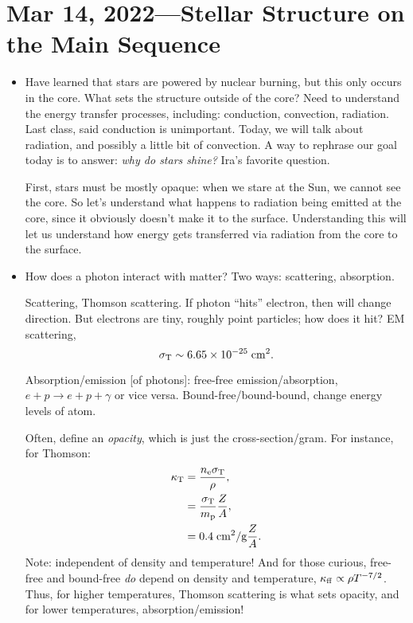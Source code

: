 \documentclass[11pt,
        usenames, %
        dvipsnames %
    ]{article}
\newcommand*{\scinot}[2]{#1\times10^{#2}}
\begin{document}
\section{Mar 14, 2022---Stellar Structure on the Main Sequence}

\begin{itemize}
    \item Have learned that stars are powered by nuclear burning, but this only
        occurs in the core. What sets the structure outside of the core? Need to
        understand the energy transfer processes, including: conduction,
        convection, radiation. Last class, said conduction is unimportant.
        Today, we will talk about radiation, and possibly a little bit of
        convection. A way to rephrase our goal today is to answer: \emph{why do
        stars shine?} Ira's favorite question.

        First, stars must be mostly opaque: when we stare at the Sun, we cannot
        see the core. So let's understand what happens to radiation being
        emitted at the core, since it obviously doesn't make it to the surface.
        Understanding this will let us understand how energy gets transferred
        via radiation from the core to the surface.

    \item How does a photon interact with matter? Two ways: scattering,
        absorption.

        Scattering, Thomson scattering. If photon ``hits'' electron, then will
        change direction. But electrons are tiny, roughly point particles; how
        does it hit? EM scattering,
        \begin{equation}
            \sigma_{\rm T} \sim \scinot{6.65}{-25}\;\mathrm{cm^2}.
        \end{equation}

        Absorption/emission [of photons]: free-free emission/absorption, $e + p
        \to e + p + \gamma$ or vice versa. Bound-free/bound-bound, change energy
        levels of atom.

        Often, define an \emph{opacity}, which is just the cross-section/gram.
        For instance, for Thomson:
        \begin{align}
            \kappa_{\rm T} &= \frac{n_{\rm e}\sigma_{\rm T}}{\rho},\\
                &= \frac{\sigma_{\rm T}}{m_{\rm p}}\frac{Z}{A},\\
                &= 0.4\;\mathrm{cm^2/g}\frac{Z}{A}.
        \end{align}
        Note: independent of density and temperature! And for those curious,
        free-free and bound-free \emph{do} depend on density and temperature,
        $\kappa_{\rm ff} \propto \rho T^{-7/2}$. Thus, for higher temperatures,
        Thomson scattering is what sets opacity, and for lower temperatures,
        absorption/emission!


\end{itemize}
\end{document}
